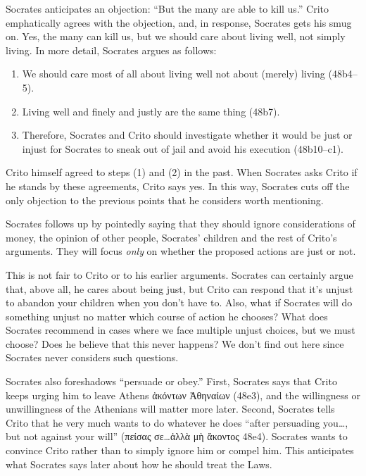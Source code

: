 \documentclass[12pt,letterpaper]{article}
\begin{document}
Socrates anticipates an objection: ``But the many are able to kill us.''
Crito emphatically agrees with the objection, and, in response, Socrates gets his smug on.
Yes, the many can kill us, but we should care about living well, not simply living.
In more detail, Socrates argues as follows:

\begin{enumerate}
    \item We should care most of all about living well not about (merely) living (48b4--5).
    \item Living well and finely and justly are the same thing (48b7).
    \item Therefore, Socrates and Crito should investigate whether it would be just or injust for Socrates to sneak out of jail and avoid his execution (48b10--c1).
\end{enumerate}

Crito himself agreed to steps (1) and (2) in the past.
When Socrates asks Crito if he stands by these agreements, Crito says yes.
In this way, Socrates cuts off the only objection to the previous points that he considers worth mentioning.

Socrates follows up by pointedly saying that they should ignore considerations of money, the opinion of other people, Socrates' children and the rest of Crito's arguments.
They will focus \emph{only} on whether the proposed actions are just or not.

This is not fair to Crito or to his earlier arguments.
Socrates can certainly argue that, above all, he cares about being just, but Crito can respond that it's unjust to abandon your children when you don't have to.
Also, what if Socrates will do something unjust no matter which course of action he chooses?
What does Socrates recommend in cases where we face multiple unjust choices, but we must choose?
Does he believe that this never happens?
We don't find out here since Socrates never considers such questions.

Socrates also foreshadows ``persuade or obey.''
First, Socrates says that Crito keeps urging him to leave Athens \textgreek{ἀκόντων Ἀθηναίων} (48e3), and the willingness or unwillingness of the Athenians will matter more later.
Second, Socrates tells Crito that he very much wants to do whatever he does ``after persuading you\dots, but not against your will'' (\textgreek{πείσας σε}\dots\textgreek{ἀλλὰ μὴ ἄκοντος} 48e4).
Socrates wants to convince Crito rather than to simply ignore him or compel him.
This anticipates what Socrates says later about how he should treat the Laws.
\end{document}
